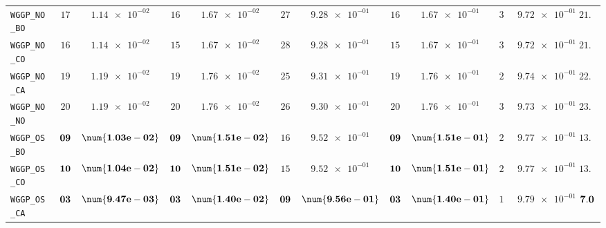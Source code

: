 \begin{table}[H]
\begin{tabularx}{\textwidth}{l||cC|cC|cC|cC|cC||c}
		\texttt{WGGP\_NO\_BO} & $ 17$ & $ \num{1.14e-02}$ & $ 16$ & $ \num{1.67e-02}$ & $ 27$ & $ \num{9.28e-01}$ & $ 16$ & $ \num{1.67e-01}$ & $ 31$ & $ \num{9.72e-01}$ & $ 21.4$  \\
		\texttt{WGGP\_NO\_CO} & $ 16$ & $ \num{1.14e-02}$ & $ 15$ & $ \num{1.67e-02}$ & $ 28$ & $ \num{9.28e-01}$ & $ 15$ & $ \num{1.67e-01}$ & $ 32$ & $ \num{9.72e-01}$ & $ 21.2$  \\
		\texttt{WGGP\_NO\_CA} & $ 19$ & $ \num{1.19e-02}$ & $ 19$ & $ \num{1.76e-02}$ & $ 25$ & $ \num{9.31e-01}$ & $ 19$ & $ \num{1.76e-01}$ & $ 29$ & $ \num{9.74e-01}$ & $ 22.2$  \\
		\texttt{WGGP\_NO\_NO} & $ 20$ & $ \num{1.19e-02}$ & $ 20$ & $ \num{1.76e-02}$ & $ 26$ & $ \num{9.30e-01}$ & $ 20$ & $ \num{1.76e-01}$ & $ 30$ & $ \num{9.73e-01}$ & $ 23.2$  \\
		\texttt{WGGP\_OS\_BO} & $\bf 09$ & $\bf \num{1.03e-02}$ & $\bf 09$ & $\bf \num{1.51e-02}$ & $ 16$ & $ \num{9.52e-01}$ & $\bf 09$ & $\bf \num{1.51e-01}$ & $ 22$ & $ \num{9.77e-01}$ & $ 13.0$  \\
		\texttt{WGGP\_OS\_CO} & $\bf 10$ & $\bf \num{1.04e-02}$ & $\bf 10$ & $\bf \num{1.51e-02}$ & $ 15$ & $ \num{9.52e-01}$ & $\bf 10$ & $\bf \num{1.51e-01}$ & $ 21$ & $ \num{9.77e-01}$ & $ 13.2$  \\
		\texttt{WGGP\_OS\_CA} & $\bf 03$ & $\bf \num{9.47e-03}$ & $\bf 03$ & $\bf \num{1.40e-02}$ & $\bf 09$ & $\bf \num{9.56e-01}$ & $\bf 03$ & $\bf \num{1.40e-01}$ & $ 17$ & $ \num{9.79e-01}$ & $\bf 7.0$  \\

\end{tabularx}
\end{table}
